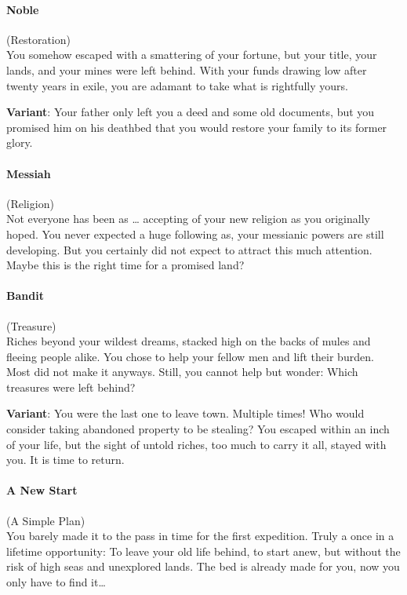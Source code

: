 \paragraph{Noble}
(Restoration)\\
You somehow escaped with a smattering of your
fortune, but your title, your lands, and your mines were left behind. With
your funds drawing low after twenty years in exile, you are adamant to take
what is rightfully yours.

\textbf{Variant}: Your father only left you a deed and some old
documents, but you promised him on his deathbed that you would restore
your family to its former glory.


\paragraph{Messiah} (Religion) \\
Not everyone has been as … accepting of your new
religion as you originally hoped. You never expected a huge following as,
your messianic powers are still developing. But you certainly did not
expect to attract this much attention. Maybe this is the right time for
a promised land?


\paragraph{Bandit} (Treasure)\\
Riches beyond your wildest dreams, stacked high on
the backs of mules and fleeing people alike. You chose to help your
fellow men and lift their burden. Most did not make it anyways.
Still, you cannot help but wonder: Which treasures were left behind?

\textbf{Variant}: You were the last one to leave town. Multiple times!
Who would consider taking abandoned property to be stealing? You escaped
within an inch of your life, but the sight of untold riches, too much to
carry it all, stayed with you. It is time to return.

\paragraph{A New Start} (A Simple Plan)\\
You barely made it to the pass in time for the
first expedition. Truly a once in a lifetime opportunity: To leave your old life behind, to start anew, but without the risk of high seas and unexplored lands.
The bed is already made for you, now you only have to find it…

